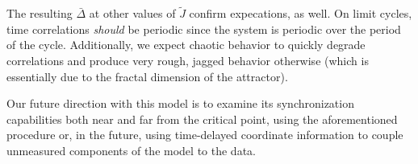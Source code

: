 \documentclass{article} %
\begin{document}
The resulting $\bar{\Delta}$ at other values of $\tilde{J}$ confirm expecations, as well.  On limit cycles, time correlations \emph{should} be periodic since the system is periodic over the period of the cycle.  Additionally, we expect chaotic behavior to quickly degrade correlations and produce very rough, jagged behavior otherwise (which is essentially due to the fractal dimension of the attractor).

Our future direction with this model is to examine its synchronization capabilities both near and far from the critical point, using the aforementioned procedure or, in the future, using time-delayed coordinate information to couple unmeasured components of the model to the data.



\end{document}
